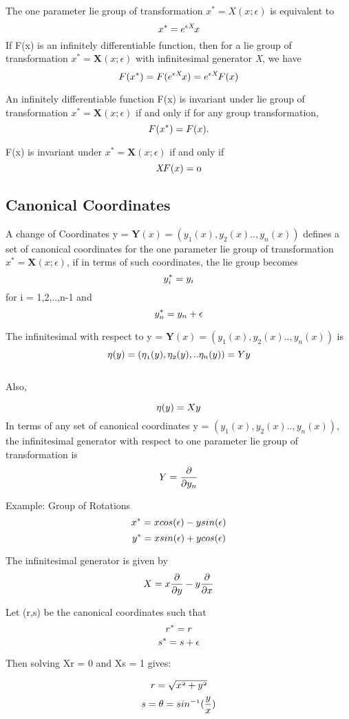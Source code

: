 \documentclass[A4paper, 22pt]{article}
\begin{document}
The one parameter lie group of transformation $x^{*} = X(x;\epsilon)$ is equivalent to 
\[
\mathnormal{x^{*} = e^{\epsilon\textit{X}}x}
\]
If F(x) is an infinitely differentiable function, then for a lie group of transformation $x^{*} = \textbf{X}(x;\epsilon)$ with infinitesimal generator \textit{X}, we have 
\[
\mathnormal{F(x^{*}) = F(e^{\epsilon\textit{X}}x) = e^{\epsilon\textit{X}}F(x) }
\]

An infinitely differentiable function F(x) is invariant under lie group of transformation $x^{*} = \textbf{X}(x;\epsilon)$ if and only if for any group transformation,  
\[
\mathnormal{F(x^{*}) = F(x). }
\]

F(x) is invariant under $x^{*} = \textbf{X}(x;\epsilon)$ if and only if
\[
\mathnormal{ \textit{X}F(x) = 0}
\]

\subsection{Canonical Coordinates}
A change of Coordinates y = $\textbf{Y}(x) = (y_1(x), y_2(x)..,y_n(x))$ defines a set of canonical coordinates for the one parameter lie group of transformation $x^{*} = \textbf{X}(x;\epsilon)$, if in terms of such coordinates, the lie group becomes
\[\mathnormal{y_i^{*} = y_i }\]   for i = 1,2,..,n-1 
and
\[\mathnormal{y_n^{*} = y_n + \epsilon}\]

The infinitesimal with respect to y = $\textbf{Y}(x) = (y_1(x), y_2(x)..,y_n(x))$  is 
\[\mathnormal{\eta(y) = (\eta_1(y), \eta_2(y),..\eta_n(y)) = Yy }\]\\
Also, 

\[\mathnormal{\eta(y) = Xy}\]
In terms of any set of canonical coordinates y = $(y_1(x), y_2(x)..,y_n(x))$, the infinitesimal generator with respect to one parameter lie group of transformation is
\[\mathnormal{Y = \frac{\partial }{\partial y_n}}\]


Example: Group of Rotations
\[
\mathnormal{x^{*} = xcos(\epsilon) - ysin(\epsilon)}\]
\[
\mathnormal{y^{*} = xsin(\epsilon) + y cos(\epsilon)}\]

The infinitesimal generator is given by 
\[
\mathnormal{X = x\frac{\partial}{\partial y} - y\frac{\partial}{\partial x}}\]

Let (r,s) be the canonical coordinates such that
\[
\mathnormal{r^{*} = r}\]
\[
\mathnormal{s^{*} = s + \epsilon}\]

Then solving Xr = 0 and Xs = 1 gives:

\[
\mathnormal{r = \sqrt{x^{2} + y^{2} }}\]
\[
\mathnormal{s = \theta = sin^{-1}(\frac{y}{x})}\]
\end{document}
